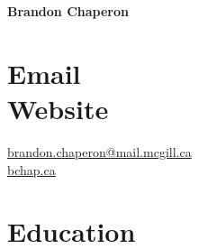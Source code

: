 \documentclass[margin,line]{resume}
\begin{document}
{\Large \textbf{Brandon Chaperon}}
\begin{resume}


	\section{\mysidestyle Email \vspace{0.3em}\\Website}
	\href{mailto:brandon.chaperon@mail.mcgill.ca}{%
		brandon.chaperon@mail.mcgill.ca
	}\vspace{0.3em}\\
	\href{https://bchaper0n.github.io/}{bchap.ca}


	\vspace{-0.5em}


	\section{\mysidestyle Education}


\end{resume}
\end{document}
